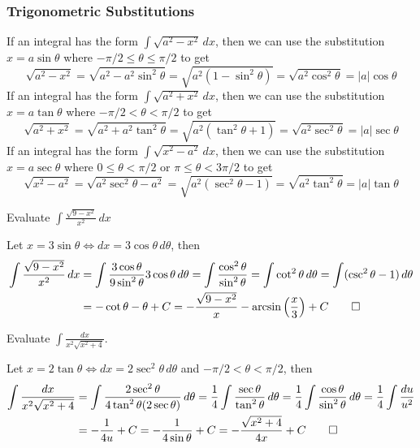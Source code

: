\subsubsection{Trigonometric Substitutions}
If an integral has the form \(\displaystyle{\int\sqrt{a^2-x^2}\,dx}\),
then we can use the substitution \(x=a\sin\theta\) where
\(-\pi/2\leq\theta\leq\pi/2\) to get
\[\sqrt{a^2-x^2}=\sqrt{a^2-a^2\sin^2\theta}=\sqrt{a^2(1-\sin^2\theta)}
=\sqrt{a^2\cos^2\theta}=|a|\cos\theta\]
If an integral has the form \(\displaystyle{\int\sqrt{a^2+x^2}\,dx}\),
then we can use the substitution \(x=a\tan\theta\) where
\(-\pi/2<\theta<\pi/2\) to get
\[\sqrt{a^2+x^2}=\sqrt{a^2+a^2\tan^2\theta}=\sqrt{a^2(\tan^2\theta+1)}
=\sqrt{a^2\sec^2\theta}=|a|\sec\theta\]
If an integral has the form \(\displaystyle{\int\sqrt{x^2-a^2}\,dx}\),
then we can use the substitution \(x=a\sec\theta\) where
\(0\leq\theta<\pi/2\) or \(\pi\leq\theta<3\pi/2\) to get
\[\sqrt{x^2-a^2}=\sqrt{a^2\sec^2\theta-a^2}=\sqrt{a^2(\sec^2\theta-1)}
=\sqrt{a^2\tan^2\theta}=|a|\tan\theta\]
\begin{problem}
    Evaluate \(\displaystyle{\int\frac{\sqrt{9-x^2}}{x^2}\,dx}\)
\end{problem}
\begin{solution}
    Let \(x=3\sin\theta\iff dx=3\cos\theta\,d\theta\), then
    \begin{align*}
        \int\frac{\sqrt{9-x^2}}{x^2}\,dx
        &= \int\frac{3\cos\theta}{9\sin^2\theta}3\cos\theta\,d\theta
        =\int\frac{\cos^2\theta}{\sin^2\theta}=\int\cot^2\theta\,d\theta
        =\int(\csc^2\theta-1)\,d\theta \\
        &=-\cot\theta-\theta+C
        =-\frac{\sqrt{9-x^2}}{x}-\arcsin\left(\frac{x}{3}\right)+C \qedhere
    \end{align*}
\end{solution}
\begin{problem}
    Evaluate \(\displaystyle{\int\frac{dx}{x^2\sqrt{x^2+4}}}\).
\end{problem}
\begin{solution}
    Let \(x=2\tan\theta\iff dx=2\sec^2\theta\,d\theta\) and
    \(-\pi/2<\theta<\pi/2\), then
    \begin{align*}
        \int\frac{dx}{x^2\sqrt{x^2+4}}
        &= \int\frac{2\sec^2\theta}{4\tan^2\theta(2\sec\theta)}\,d\theta
        =\frac{1}{4}\int\frac{\sec\theta}{\tan^2\theta}\,d\theta
        =\frac{1}{4}\int\frac{\cos\theta}{\sin^2\theta}\,d\theta
        =\frac{1}{4}\int\frac{du}{u^2} \\
        &= -\frac{1}{4u}+C=-\frac{1}{4\sin\theta}+C
        =-\frac{\sqrt{x^2+4}}{4x}+C \qedhere
    \end{align*}
\end{solution}
